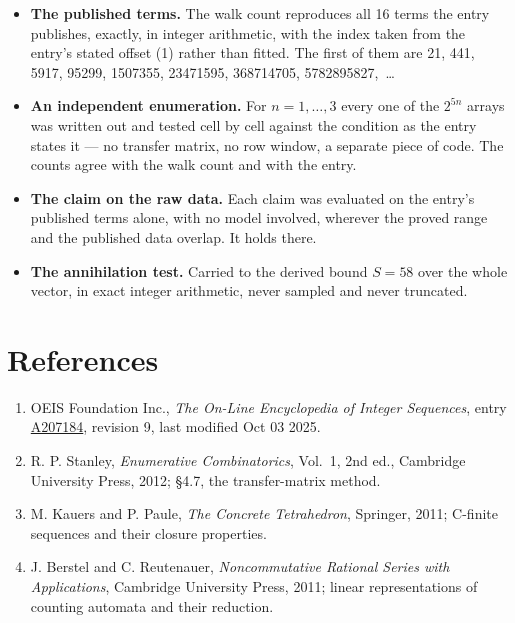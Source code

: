 \documentclass[11pt]{article}
\theoremstyle{definition}
\begin{document}
\begin{itemize}

\item {\bfseries The published terms.} The walk count reproduces all 16 terms the entry publishes, exactly, in integer arithmetic, with the index taken from the entry's stated offset (1) rather than fitted. The first of them are 21, 441, 5917, 95299, 1507355, 23471595, 368714705, 5782895827,~\dots

\item {\bfseries An independent enumeration.} For $n = 1,\dots,3$ every one of the $2^{5n}$ arrays was written out and tested cell by cell against the condition as the entry states it --- no transfer matrix, no row window, a separate piece of code. The counts agree with the walk count and with the entry.

\item {\bfseries The claim on the raw data.} Each claim was evaluated on the entry's published terms alone, with no model involved, wherever the proved range and the published data overlap. It holds there.

\item {\bfseries The annihilation test.} Carried to the derived bound $S = 58$ over the whole vector, in exact integer arithmetic, never sampled and never truncated.

\end{itemize}

\section{References}

\begin{enumerate}

\item OEIS Foundation Inc., \emph{The On-Line Encyclopedia of Integer Sequences}, entry \href{https://oeis.org/A207184}{A207184}, revision 9, last modified Oct 03 2025.

\item R. P. Stanley, \emph{Enumerative Combinatorics}, Vol.~1, 2nd ed., Cambridge University Press, 2012; \S4.7, the transfer-matrix method.

\item M. Kauers and P. Paule, \emph{The Concrete Tetrahedron}, Springer, 2011; C-finite sequences and their closure properties.

\item J. Berstel and C. Reutenauer, \emph{Noncommutative Rational Series with Applications}, Cambridge University Press, 2011; linear representations of counting automata and their reduction.

\end{enumerate}
\end{document}
